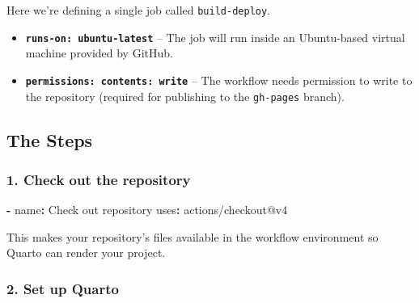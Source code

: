 \documentclass[
  letterpaper,
  DIV=11,
  numbers=noendperiod]{scrreprt}
\newenvironment{Shaded}{\begin{snugshade}}{\end{snugshade}}
\newcommand{\AttributeTok}[1]{\textcolor[rgb]{0.40,0.45,0.13}{#1}}
\newcommand{\CharTok}[1]{\textcolor[rgb]{0.13,0.47,0.30}{#1}}
\newcommand{\FunctionTok}[1]{\textcolor[rgb]{0.28,0.35,0.67}{#1}}
\newcommand{\KeywordTok}[1]{\textcolor[rgb]{0.00,0.23,0.31}{\textbf{#1}}}
\begin{document}
Here we're defining a single job called \texttt{build-deploy}.

\begin{itemize}
\item
  \textbf{\texttt{runs-on:\ ubuntu-latest}} -- The job will run inside
  an Ubuntu-based virtual machine provided by GitHub.
\item
  \textbf{\texttt{permissions:\ contents:\ write}} -- The workflow needs
  permission to write to the repository (required for publishing to the
  \texttt{gh-pages} branch).
\end{itemize}

\subsection{The Steps}\label{the-steps}

\subsubsection{1. Check out the
repository}\label{check-out-the-repository}

\begin{Shaded}
\begin{Highlighting}[]
\KeywordTok{{-}}\AttributeTok{ }\FunctionTok{name}\KeywordTok{:}\AttributeTok{ Check out repository}
\AttributeTok{  }\FunctionTok{uses}\KeywordTok{:}\AttributeTok{ actions/checkout@v4}
\end{Highlighting}
\end{Shaded}

This makes your repository's files available in the workflow environment
so Quarto can render your project.

\subsubsection{2. Set up Quarto}\label{set-up-quarto}

\begin{Shaded}
\end{Shaded}
\end{document}
